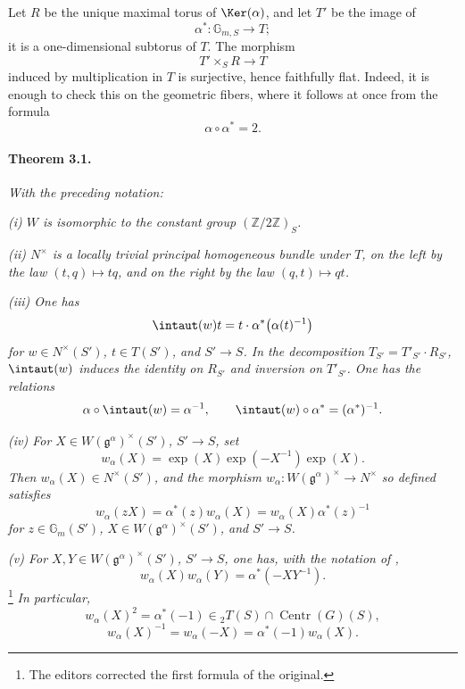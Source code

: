 Let \(R\) be the unique maximal torus of \(\Ker(\alpha)\), and let
\(T'\) be the image of
\[
  \alpha^\ast\colon\mathbb G_{m,S}\longrightarrow T;
\]
it is a one-dimensional subtorus of \(T\).  The morphism
\[
  T'\times_S R\longrightarrow T
\]
induced by multiplication in \(T\) is surjective, hence faithfully
flat.  Indeed, it is enough to check this on the geometric fibers,
where it follows at once from the formula
\[
  \alpha\circ\alpha^\ast=2.
\]

\paragraph{\textbf{Theorem 3.1.}}
\emph{With the preceding notation:}

\smallskip
\noindent\emph{\textup{(i)} \(W\) is isomorphic to the constant group
\((\mathbb Z/2\mathbb Z)_S\).}

\smallskip
\noindent\emph{\textup{(ii)} \(N^\times\) is a locally trivial
principal homogeneous bundle under \(T\), on the left by the law
\((t,q)\mapsto tq\), and on the right by the law
\((q,t)\mapsto qt\).}

\smallskip
\noindent\emph{\textup{(iii)} One has}
\[
  \intaut(w)t=t\cdot\alpha^\ast\bigl(\alpha(t)^{-1}\bigr)
\]
\emph{for \(w\in N^\times(S')\), \(t\in T(S')\), and \(S'\to S\).
In the decomposition \(T_{S'}=T'_{S'}\cdot R_{S'}\),
\(\intaut(w)\) induces the identity on \(R_{S'}\) and inversion on
\(T'_{S'}\).  One has the relations}
\[
  \alpha\circ\intaut(w)=\alpha^{-1},
  \qquad
  \intaut(w)\circ\alpha^\ast=(\alpha^\ast)^{-1}.
\]

\smallskip
\noindent\emph{\textup{(iv)} For
\(X\in W(\mathfrak g^\alpha)^\times(S')\), \(S'\to S\), set}
\[
  w_\alpha(X)
    =\exp(X)\exp(-X^{-1})\exp(X).
\]
\emph{Then \(w_\alpha(X)\in N^\times(S')\), and the morphism
\(w_\alpha\colon W(\mathfrak g^\alpha)^\times\to N^\times\) so
defined satisfies}
\[
  w_\alpha(zX)
    =\alpha^\ast(z)w_\alpha(X)
    =w_\alpha(X)\alpha^\ast(z)^{-1}
\]
\emph{for \(z\in\mathbb G_m(S')\),
\(X\in W(\mathfrak g^\alpha)^\times(S')\), and \(S'\to S\).}

\smallskip
\noindent\emph{\textup{(v)} For
\(X,Y\in W(\mathfrak g^\alpha)^\times(S')\), \(S'\to S\), one has,
with the notation of ,}
\[
  w_\alpha(X)w_\alpha(Y)=\alpha^\ast(-XY^{-1}).
\]
\footnote{The editors corrected the first formula of the original.}
\emph{In particular,}
\[
  w_\alpha(X)^2
    =\alpha^\ast(-1)
    \in {}_2T(S)\cap\operatorname{Centr}(G)(S),
\]
\[
  w_\alpha(X)^{-1}
    =w_\alpha(-X)
    =\alpha^\ast(-1)w_\alpha(X).
\]

